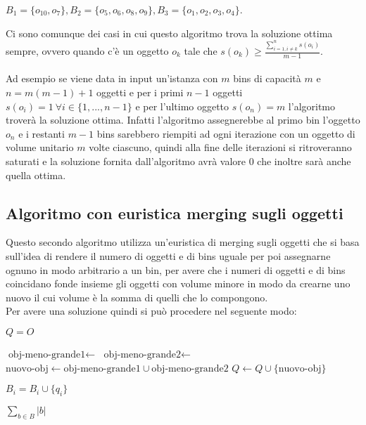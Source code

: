\begin{center}
	$ B_1 = \{o_{10}, o_7\}, B_2 = \{o_5, o_6, o_8, o_9\}, B_3 = \{o_1, o_2, o_3, o_4\} $.
\end{center}

\noindent
Ci sono comunque dei casi in cui questo algoritmo trova la soluzione ottima sempre, ovvero quando c'è un oggetto $ o_k $ tale che 
$ s(o_k) \geq \displaystyle\frac{\sum_{i=1, i \neq k}^n s(o_i)}{m - 1} $. \\ \\ 
Ad esempio se viene data in input un'istanza con $ m $ bins di capacità $ m $ e $ n = m(m - 1) + 1 $ oggetti e per i primi $ n - 1 $ oggetti 
$ s(o_i) = 1 \: \forall i \in \{1, ..., n - 1\} $ e per l'ultimo oggetto $ s(o_n) = m $ l'algoritmo troverà la soluzione ottima.
Infatti l'algoritmo assegnerebbe al primo bin l'oggetto $ o_n $ e i restanti $ m - 1 $ bins sarebbero riempiti ad ogni iterazione 
con un oggetto di volume unitario $ m $ volte ciascuno, quindi alla fine delle iterazioni si ritroveranno saturati e la soluzione 
fornita dall'algoritmo avrà valore $ 0 $ che inoltre sarà anche quella ottima.

\subsection{Algoritmo con euristica merging sugli oggetti}
Questo secondo algoritmo utilizza un'euristica di merging sugli oggetti che si basa sull'idea di rendere il numero di oggetti e di
bins uguale per poi assegnarne ognuno in modo arbitrario a un bin, per avere che i numeri di oggetti e di bins coincidano fonde insieme gli oggetti
con volume minore in modo da crearne uno nuovo il cui volume è la somma di quelli che lo compongono.\\
Per avere una soluzione quindi si può procedere nel seguente modo:
\begin{algorithm}[H]
\begin{algorithmic}[1]

    \State $ Q = O $

        \State $ \text{obj-meno-grande1} \leftarrow $ 
        \State $ \text{obj-meno-grande2} \leftarrow $ 
        \State $ \text{nuovo-obj} \leftarrow \text{obj-meno-grande1} \cup \text{obj-meno-grande2} $
        \State $ Q \leftarrow Q \cup \{\text{nuovo-obj}\} $
    \EndWhile
    
    	\State $ B_i = B_i \cup \{q_i\} $
    \EndFor
    
    \State \Return $ \displaystyle\sum\limits_{b \in B} |b| $
\EndFunction

\end{algorithmic}
\end{algorithm}

